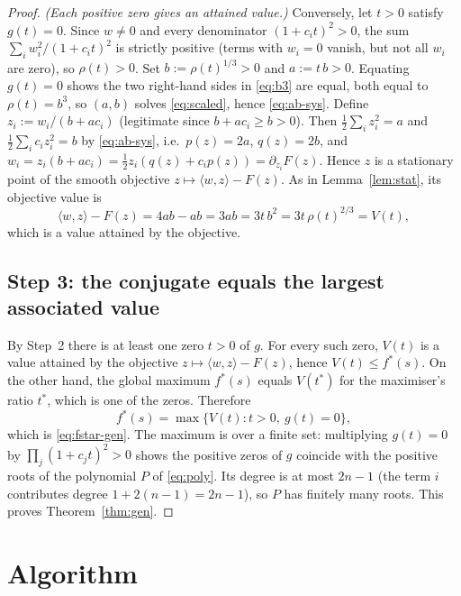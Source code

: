 \documentclass{amsart}
\theoremstyle{definition}
\begin{document}
\begin{proof}
\emph{(Each positive zero gives an attained value.)} Conversely, let $t>0$ satisfy $g(t)=0$.  Since
$w\neq0$ and every denominator $(1+c_it)^2>0$, the sum $\sum_i w_i^2/(1+c_it)^2$ is strictly
positive (terms with $w_i=0$ vanish, but not all $w_i$ are zero), so $\rho(t)>0$.  Set
$b:=\rho(t)^{1/3}>0$ and $a:=t\,b>0$.  Equating $g(t)=0$ shows the two right-hand sides in
\eqref{eq:b3} are equal, both equal to $\rho(t)=b^3$, so $(a,b)$ solves \eqref{eq:scaled}, hence
\eqref{eq:ab-sys}.  Define $z_i:=w_i/(b+ac_i)$ (legitimate since $b+ac_i\ge b>0$).  Then
$\tfrac12\sum_i z_i^2=a$ and $\tfrac12\sum_i c_iz_i^2=b$ by \eqref{eq:ab-sys}, i.e.\
$p(z)=2a$, $q(z)=2b$, and $w_i=z_i(b+ac_i)=\tfrac12 z_i(q(z)+c_ip(z))=\partial_{z_i}F(z)$.  Hence $z$
is a stationary point of the smooth objective $z\mapsto\langle w,z\rangle-F(z)$.  As in
Lemma~\ref{lem:stat}, its objective value is
\[
\langle w,z\rangle-F(z)=4ab-ab=3ab=3t\,b^2=3t\,\rho(t)^{2/3}=V(t),
\]
which is a value attained by the objective.

\subsection*{Step 3: the conjugate equals the largest associated value}
By Step~2 there is at least one zero $t>0$ of $g$.  For every such zero, $V(t)$ is a value attained
by the objective $z\mapsto\langle w,z\rangle-F(z)$, hence $V(t)\le f^\ast(s)$.  On the other hand,
the global maximum $f^\ast(s)$ equals $V(t^\ast)$ for the maximiser's ratio $t^\ast$, which is one of
the zeros.  Therefore
\[
f^\ast(s)=\max\{V(t):t>0,\ g(t)=0\},
\]
which is \eqref{eq:fstar-gen}.  The maximum is over a finite set: multiplying $g(t)=0$ by
$\prod_j(1+c_jt)^2>0$ shows the positive zeros of $g$ coincide with the positive roots of the
polynomial $P$ of \eqref{eq:poly}.  Its degree is at most $2n-1$ (the term $i$ contributes degree
$1+2(n-1)=2n-1$), so $P$ has finitely many roots.  This proves Theorem~\ref{thm:gen}.
\end{proof}

\section{Algorithm}
\end{document}
